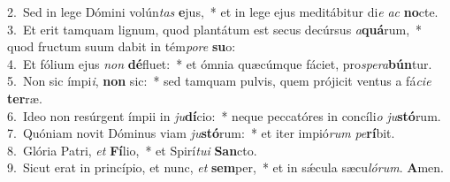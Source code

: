 {2.~}Sed in lege Dómini volún\textit{tas} \textbf{e}jus,~* et in lege ejus meditábitur di\textit{e} \textit{ac} \textbf{no}cte.\\
{3.~}Et erit tamquam lignum, quod plantátum est secus decúrsus \textit{a}\textbf{quá}rum,~* quod fructum suum dabit in tém\textit{po}\textit{re} \textbf{su}o:\\
{4.~}Et fólium ejus \textit{non} \textbf{dé}fluet:~* et ómnia quæcúmque fáciet, pro\textit{spe}\textit{ra}\textbf{bún}tur.\\
{5.~}Non sic ímpi\textit{i}, \textbf{non} sic:~* sed tamquam pulvis, quem prójicit ventus a fá\textit{ci}\textit{e} \textbf{ter}ræ.\\
{6.~}Ideo non resúrgent ímpii in \textit{ju}\textbf{dí}cio:~* neque peccatóres in concíli\textit{o} \textit{ju}\textbf{stó}rum.\\
{7.~}Quóniam novit Dóminus viam \textit{ju}\textbf{stó}rum:~* et iter impió\textit{rum} \textit{pe}\textbf{rí}bit.\\
{8.~}Glória Patri, \textit{et} \textbf{Fí}lio,~* et Spirí\textit{tu}\textit{i} \textbf{San}cto.\\
{9.~}Sicut erat in princípio, et nunc, \textit{et} \textbf{sem}per,~* et in sǽcula sæcu\textit{ló}\textit{rum}. \textbf{A}men.\\
